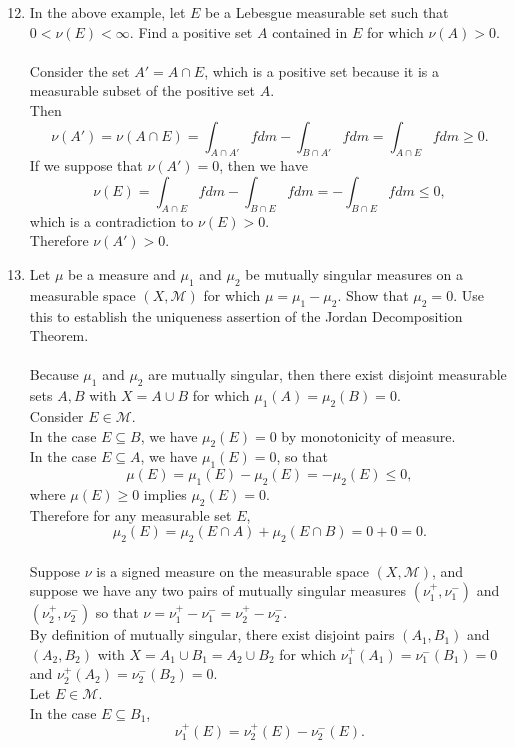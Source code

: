 \begin{enumerate}
	\setcounter{enumi}{11}
	\item In the above example, let $E$ be a Lebesgue measurable set such that $0<\nu(E)<\infty$.
	Find a positive set $A$ contained in $E$ for which $\nu(A)>0$.\\
	\\Consider the set $A'=A\cap E$, which is a positive set because it is a measurable subset of the positive set $A$.
	\\Then
	\[
		\nu(A')=\nu(A\cap E)=\int_{A\cap A'} f dm-\int_{B\cap A'} f dm=\int_{A\cap E} f dm\ge0.
	\]
	If we suppose that $\nu(A')=0$, then we have
	\[
		\nu(E)=\int_{A\cap E} f dm-\int_{B\cap E} f dm=-\int_{B\cap E} f dm\le0,
	\]
	which is a contradiction to $\nu(E)>0$.
	\\Therefore $\nu(A')>0$.
	\item Let $\mu$ be a measure and $\mu_1$ and $\mu_2$ be mutually singular measures on a measurable space $(X,\mathcal{M})$ for which $\mu=\mu_1-\mu_2$.
	Show that $\mu_2=0$.
	Use this to establish the uniqueness assertion of the Jordan Decomposition Theorem.\\
	\\Because $\mu_1$ and $\mu_2$ are mutually singular, then there exist disjoint measurable sets $A,B$ with $X=A\cup B$ for which $\mu_1(A)=\mu_2(B)=0$.
	\\Consider $E\in\mathcal{M}$.
	\\In the case $E\subseteq B$, we have $\mu_2(E)=0$ by monotonicity of measure.
	\\In the case $E\subseteq A$, we have $\mu_1(E)=0$, so that
	\[
		\mu(E)=\mu_1(E)-\mu_2(E)=-\mu_2(E)\le0,
	\]
	where $\mu(E)\ge0$ implies $\mu_2(E)=0$.
	\\Therefore for any measurable set $E$,
	\[
		\mu_2(E)=\mu_2(E\cap A)+\mu_2(E\cap B)=0+0=0.
	\]
	\\Suppose $\nu$ is a signed measure on the measurable space $(X,\mathcal{M})$, and suppose we have any two pairs of mutually singular measures $(\nu_1^+,\nu_1^-)$ and $(\nu_2^+,\nu_2^-)$ so that $\nu=\nu_1^+-\nu_1^-=\nu_2^+-\nu_2^-$.
	\\By definition of mutually singular, there exist disjoint pairs $(A_1,B_1)$ and $(A_2,B_2)$ with $X=A_1\cup B_1=A_2\cup B_2$ for which $\nu_1^+(A_1)=\nu_1^-(B_1)=0$ and $\nu_2^+(A_2)=\nu_2^-(B_2)=0$.
	\\Let $E\in\mathcal{M}$.
	\\In the case $E\subseteq B_1$,
	\[
		\nu_1^+(E)=\nu_2^+(E)-\nu_2^-(E).
\]
\end{enumerate}
